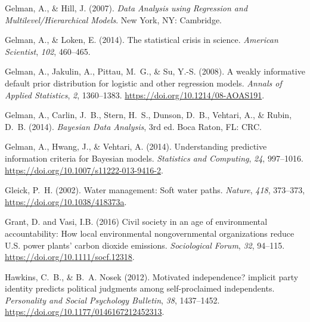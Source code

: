 \documentclass[draft]{agujournal}\usepackage{knitr}
\begin{document}
\begin{thebibliography}{33}
  Gelman, A., \& Hill, J. (2007).
  \textit{Data Analysis using Regression and Multilevel/Hierarchical Models}.
  New York, NY: Cambridge.

  Gelman, A., \& Loken, E. (2014).
  The statistical crisis in science.
  \textit{American Scientist}, \textit{102}, 460--465.

  Gelman, A., Jakulin, A., Pittau, M.~G., \& Su, Y.-S. (2008).
  A weakly informative default prior distribution for logistic and other
  regression models.
  \textit{Annals of Applied Statistics}, \textit{2}, 1360--1383.
  \url{https://doi.org/10.1214/08-AOAS191}.

  Gelman, A., Carlin, J.~B., Stern, H.~S., Dunson, D.~B., Vehtari, A., \&
  Rubin, D.~B. (2014{}).
  \textit{{B}ayesian Data Analysis}, 3rd ed.
  Boca Raton, FL: CRC.

  Gelman, A., Hwang, J., \& Vehtari, A. (2014{}).
  Understanding predictive information criteria for Bayesian models.
  \textit{Statistics and Computing}, \textit{24}, 997--1016.
  \url{https://doi.org/10.1007/s11222-013-9416-2}.

  Gleick, P.~H. (2002).
  Water management: {S}oft water paths.
  \textit{Nature},
  \textit{418}, 373--373, \url{https://doi.org/10.1038/418373a}.

  Grant, D. and Vasi, I.B. (2016)
  Civil society in an age of environmental accountability:
  How local environmental nongovernmental organizations reduce
  U.S. power plants' carbon dioxide emissions.
  \textit{Sociological Forum}, \textit{32}, 94--115.
  \url{https://doi.org/10.1111/socf.12318}.

  Hawkins, C.~B., \& B.~A. Nosek (2012).
  Motivated independence? implicit party identity predicts political judgments
  among self-proclaimed independents.
  \textit{Personality and Social Psychology Bulletin}, \textit{38}, 1437--1452.
  \url{https://doi.org/10.1177/0146167212452313}.


\end{thebibliography}
\end{document}
